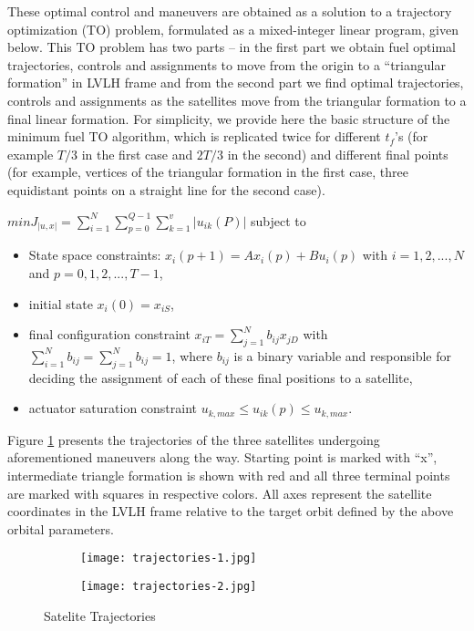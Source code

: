 These optimal control and maneuvers are obtained as a solution to a
trajectory optimization (TO) problem, formulated as a mixed-integer
linear program, given below. This TO problem has two parts – in the
first part we obtain fuel optimal trajectories, controls and
assignments to move from the origin to a ``triangular formation'' in
LVLH frame and from the second part we find optimal trajectories,
controls and assignments as the satellites move from the triangular
formation to a final linear formation. For simplicity, we provide here
the basic structure of the minimum fuel TO algorithm, which is
replicated twice for different $t_f$'s (for example $T/3$ in the first
case and $2T/3$ in the second) and different final points (for
example, vertices of the triangular formation in the first case, three
equidistant points on a straight line for the second case).

$min J_{|u,x|} = \sum_{i=1}^{N} \sum_{p=0}^{Q-1} \sum_{k=1}^{v} | u_{ik} (P)|$
subject to
\begin{itemize}
\item State space constraints:
  $x_i(p+1) = Ax_i(p)+Bu_i(p)$ with $i = 1,2,...,N$ and $p = 0,1,2,...,T-1$,
\item initial state $x_i(0) = x_{iS}$,
\item final configuration constraint
  $x_{iT} = \sum_{j=1}^{N}b_{ij}x_{jD}$
  with $\sum_{i=1}^{N}b_{ij} = \sum_{j=1}^{N}b_{ij} = 1$,
  where $b_{ij}$
  is a binary variable and responsible for deciding the assignment of
  each of these final positions to a satellite,
\item actuator saturation constraint $u_{k,max} \leq u_{ik}(p) \leq u_{k,max}$.
\end{itemize}

Figure \ref{fig:trajectories} presents the trajectories of the three
satellites undergoing aforementioned maneuvers along the way. Starting
point is marked with ``x'', intermediate triangle formation is shown
with red and all three terminal points are marked with squares in
respective colors. All axes represent the satellite coordinates in the
LVLH frame relative to the target orbit defined by the above orbital
parameters.

\begin{figure}
\centering

\begin{subfigure}{0.4\textwidth}
\texttt{[image: trajectories-1.jpg]}
\end{subfigure}

\hfill

\begin{subfigure}{0.4\textwidth}
\texttt{[image: trajectories-2.jpg]}
\end{subfigure}

\caption{Satelite Trajectories}
\label{fig:trajectories}
\end{figure}

